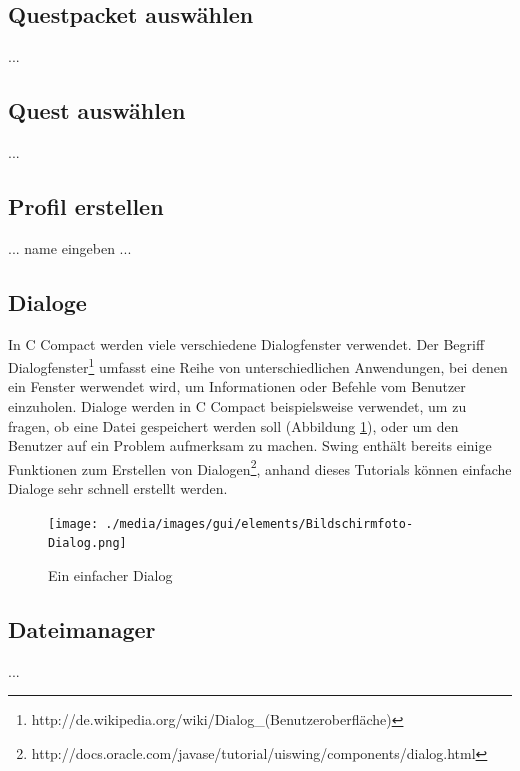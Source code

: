 \subsection{Questpacket auswählen}
...

\subsection{Quest auswählen}
...

\subsection{Profil erstellen}
... name eingeben ...

\subsection{Dialoge}
\label{sec:win-dialog}
In C Compact werden viele verschiedene Dialogfenster verwendet. Der Begriff Dialogfenster\footnote{http://de.wikipedia.org/wiki/Dialog\_(Benutzeroberfläche)} umfasst eine Reihe von unterschiedlichen Anwendungen, bei denen ein Fenster werwendet wird, um Informationen oder Befehle vom Benutzer einzuholen. Dialoge werden in C Compact beispielsweise verwendet, um zu fragen, ob eine Datei gespeichert werden soll (Abbildung \ref{fig:win-dialog}), oder um den Benutzer auf ein Problem aufmerksam zu machen. Swing enthält bereits einige Funktionen zum Erstellen von Dialogen\footnote{http://docs.oracle.com/javase/tutorial/uiswing/components/dialog.html}, anhand dieses Tutorials können einfache Dialoge sehr schnell erstellt werden.

\begin{figure}[htp]
\centering
\texttt{[image: ./media/images/gui/elements/Bildschirmfoto-Dialog.png]}
\caption{Ein einfacher Dialog}
\label{fig:win-dialog}
\end{figure}

\subsection{Dateimanager}
...

